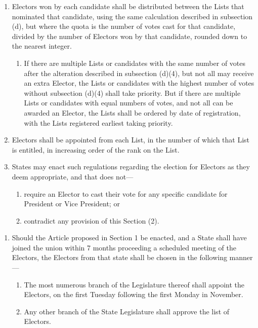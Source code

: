 \documentclass{article}
\begin{document}
\begin{enumerate}
\begin{enumerate}
        \end{enumerate}
        \item Electors won by each candidate shall be distributed between the Lists that nominated that candidate, using the same calculation described in subsection (d), but where the quota is the number of votes cast for that candidate, divided by the number of Electors won by that candidate, rounded down to the nearest integer.
        \begin{enumerate}
            \item If there are multiple Lists or candidates with the same number of votes after the alteration described in subsection (d)(4), but not all may receive an extra Elector, the Lists or candidates with the highest number of votes without subsection (d)(4) shall take priority. But if there are multiple Lists or candidates with equal numbers of votes, and not all can be awarded an Elector, the Lists shall be ordered by date of registration, with the Lists registered earliest taking priority. 
        \end{enumerate}
        \item Electors shall be appointed from each List, in the number of which that List is entitled, in increasing order of the rank on the List. 
        \item States may enact such regulations regarding the election for Electors as they deem appropriate, and that does not---
        \begin{enumerate}
            \item require an Elector to cast their vote for any specific candidate for President or Vice President; or
            \item contradict any provision of this Section (2).
        \end{enumerate}    
    \end{enumerate}
    \begin{enumerate}   
        \item Should the Article proposed in Section 1 be enacted, and a State shall have joined the union within 7 months proceeding a scheduled meeting of the Electors, the Electors from that state shall be chosen in the following manner---
        \begin{enumerate}
            \item The most numerous branch of the Legislature thereof shall appoint the Electors, on the first Tuesday following the first Monday in November.
            \item Any other branch of the State Legislature shall approve the list of Electors.
        \end{enumerate}
    \end{enumerate}
\end{document}
